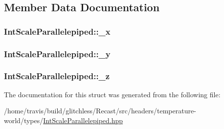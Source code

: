 \subsection{Member Data Documentation}
\hypertarget{struct_int_scale_parallelepiped_a81ba3ef17d50475ba400ecae4f45a528}{
\subsubsection[{\-\_\-x}]{ Int\-Scale\-Parallelepiped\-::\-\_\-x\hspace{0.3cm}{\ttfamily [protected]}}}\label{struct_int_scale_parallelepiped_a81ba3ef17d50475ba400ecae4f45a528}
\hypertarget{struct_int_scale_parallelepiped_a42cea4ad40c67c30fc3647b4260c8a44}{
\subsubsection[{\-\_\-y}]{ Int\-Scale\-Parallelepiped\-::\-\_\-y\hspace{0.3cm}{\ttfamily [protected]}}}\label{struct_int_scale_parallelepiped_a42cea4ad40c67c30fc3647b4260c8a44}
\hypertarget{struct_int_scale_parallelepiped_a613558e63f3ecc557cc086d8ddb17d30}{
\subsubsection[{\-\_\-z}]{ Int\-Scale\-Parallelepiped\-::\-\_\-z\hspace{0.3cm}{\ttfamily [protected]}}}\label{struct_int_scale_parallelepiped_a613558e63f3ecc557cc086d8ddb17d30}


The documentation for this struct was generated from the following file\-:\begin{DoxyCompactItemize}
\item 
/home/travis/build/glitchless/\-Recast/src/headers/temperature-\/world/types/\hyperlink{_int_scale_parallelepiped_8hpp}{Int\-Scale\-Parallelepiped.\-hpp}\end{DoxyCompactItemize}
